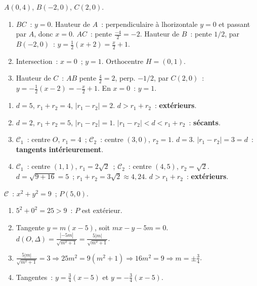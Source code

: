 
$A(0,4)$, $B(-2,0)$, $C(2,0)$.
\begin{enumerate}
  \item $BC$~: $y=0$. Hauteur de $A$~: perpendiculaire \`a l\textquotesingle horizontale $y=0$ et passant par $A$, donc $x=0$.
        $AC$~: pente $\frac{-4}{2}=-2$. Hauteur de $B$~: pente $1/2$, par $B(-2,0)$~:
        $y=\frac{1}{2}(x+2)=\frac{x}{2}+1$.
  \item Intersection~: $x=0$~; $y=1$. Orthocentre $H=(0,1)$.
  \item Hauteur de $C$~: $AB$ pente $\frac{4}{2}=2$, perp. $-1/2$, par $C(2,0)$~:
        $y=-\frac{1}{2}(x-2)=-\frac{x}{2}+1$. En $x=0$~: $y=1$.\checkmark
\end{enumerate}


\begin{enumerate}
  \item $d=5$, $r_1+r_2=4$, $|r_1-r_2|=2$. $d>r_1+r_2$~: \textbf{ext\'erieurs}.
  \item $d=2$, $r_1+r_2=5$, $|r_1-r_2|=1$. $|r_1-r_2|<d<r_1+r_2$~: \textbf{s\'ecants}.
  \item $\mathcal{C}_1$~: centre $O$, $r_1=4$~; $\mathcal{C}_2$~: centre $(3,0)$, $r_2=1$. $d=3$.
        $|r_1-r_2|=3=d$~: \textbf{tangents int\'erieurement}.
  \item $\mathcal{C}_1$~: centre $(1,1)$, $r_1=2\sqrt{2}$~; $\mathcal{C}_2$~: centre $(4,5)$, $r_2=\sqrt{2}$.
        $d=\sqrt{9+16}=5$~; $r_1+r_2=3\sqrt{2}\approx4{,}24$. $d>r_1+r_2$~: \textbf{ext\'erieurs}.
\end{enumerate}


$\mathcal{C}$~: $x^2+y^2=9$~; $P(5,0)$.
\begin{enumerate}
  \item $5^2+0^2=25>9$~: $P$ est ext\'erieur.\checkmark
  \item Tangente $y=m(x-5)$, soit $mx-y-5m=0$.
        $d(O,\Delta)=\frac{|{-5m}|}{\sqrt{m^2+1}}=\frac{5|m|}{\sqrt{m^2+1}}$.
  \item $\frac{5|m|}{\sqrt{m^2+1}}=3\Rightarrow25m^2=9(m^2+1)\Rightarrow16m^2=9\Rightarrow m=\pm\frac{3}{4}$.
  \item Tangentes~: $y=\frac{3}{4}(x-5)$ et $y=-\frac{3}{4}(x-5)$.
\end{enumerate}

